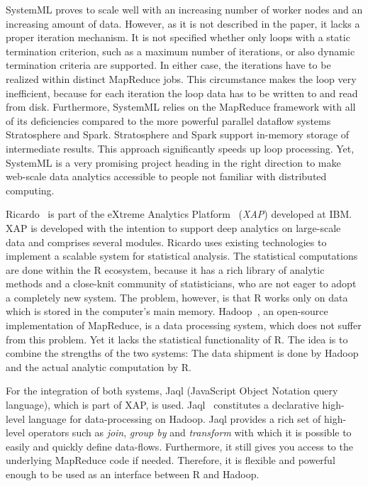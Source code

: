 SystemML proves to scale well with an increasing number of worker nodes and an increasing amount of data.
However, as it is not described in the paper, it lacks a proper iteration mechanism.
It is not specified whether only loops with a static termination criterion, such as a maximum number of iterations, or also dynamic termination criteria are supported.
In either case, the iterations have to be realized within distinct MapReduce jobs.
This circumstance makes the loop very inefficient, because for each iteration the loop data has to be written to and read from disk.
Furthermore, SystemML relies on the MapReduce framework with all of its deficiencies compared to the more powerful parallel dataflow systems Stratosphere and Spark.
Stratosphere and Spark support in-memory storage of intermediate results.
This approach significantly speeds up loop processing.
Yet, SystemML is a very promising project heading in the right direction to make web-scale data analytics accessible to people not familiar with distributed computing.

Ricardo~\cite{das:2010a} is part of the eXtreme Analytics Platform~\cite{balmin:jrd2013a} (\emph{XAP}) developed at IBM.
XAP is developed with the intention to support deep analytics on large-scale data and comprises several modules.
Ricardo uses existing technologies to implement a scalable system for statistical analysis.
The statistical computations are done within the R ecosystem, because it has a rich library of analytic methods and a close-knit community of statisticians, who are not eager to adopt a completely new system.
The problem, however, is that R works only on data which is stored in the computer's main memory.
Hadoop~\cite{hadoop:2008a}, an open-source implementation of MapReduce, is a data processing system, which does not suffer from this problem.
Yet it lacks the statistical functionality of R.
The idea is to combine the strengths of the two systems: The data shipment is done by Hadoop and the actual analytic computation by R.

For the integration of both systems, Jaql (JavaScript Object Notation query language), which is part of XAP, is used.
Jaql~\cite{beyer:2011a} constitutes a declarative high-level language for data-processing on Hadoop.
Jaql provides a rich set of high-level operators such as \emph{join}, \emph{group by} and \emph{transform} with which it is possible to easily and quickly define data-flows.
Furthermore, it still gives you access to the underlying MapReduce code if needed.
Therefore, it is flexible and powerful enough to be used as an interface between R and Hadoop.

